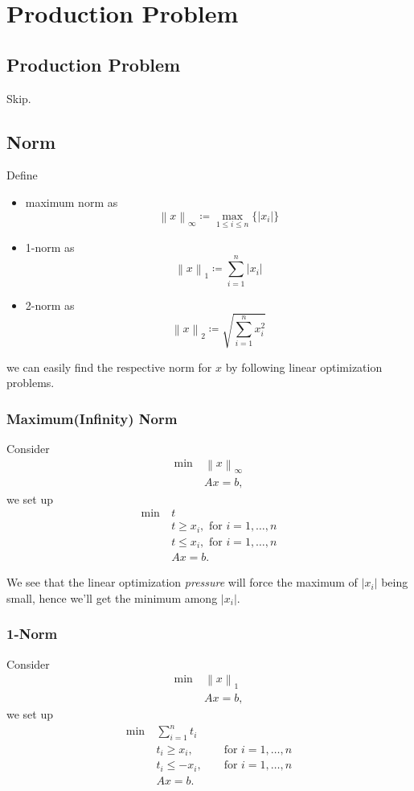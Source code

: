 \section{Production Problem}
\subsection{Production Problem}
Skip.
\subsection{Norm}
Define
\begin{itemize}
	\item maximum norm as
	      \[
		      \left\lVert x\right\rVert_{\infty } \coloneqq \max_{1\leq i \leq n}\{\left\vert x_i \right\vert \}
	      \]
	\item 1-norm as
	      \[
		      \left\lVert x\right\rVert_{1} \coloneqq \sum\limits_{i=1}^{n} \left\vert x_i \right\vert
	      \]
	\item 2-norm as
	      \[
		      \left\lVert x\right\rVert_{2} \coloneqq \sqrt{\sum\limits_{i=1}^{n} x_i^2}
	      \]
\end{itemize}
we can easily find the respective norm for \(x\) by following linear optimization problems.

\subsubsection{Maximum(Infinity) Norm}
Consider
\begin{align*}
	\min~ & \left\lVert x\right\rVert_{\infty } \\
	      & Ax = b,
\end{align*}
we set up
\begin{align*}
	\min~ & t                                      \\
	      & t\geq x_i,\text{ for }i = 1, \ldots ,n \\
	      & t\leq x_i,\text{ for }i = 1, \ldots ,n \\
	      & Ax = b.
\end{align*}

We see that the linear optimization \emph{pressure} will force the maximum of \(\left\vert x_i \right\vert \) being small, hence
we'll get the minimum among \(\left\vert x_i \right\vert \).

\subsubsection{1-Norm}
Consider
\begin{align*}
	\min~ & \left\lVert x\right\rVert_1 \\
	      & Ax = b,
\end{align*}
we set up
\[
	\begin{alignedat}{3}
		\min~ & \sum\limits_{i=1}^{n} t_i                \\
		& t_i\geq x_i, && \text{ for }i = 1, \ldots ,n  \\
		& t_i\leq -x_i, && \text{ for }i = 1, \ldots ,n \\
		& Ax = b.
	\end{alignedat}
\]

